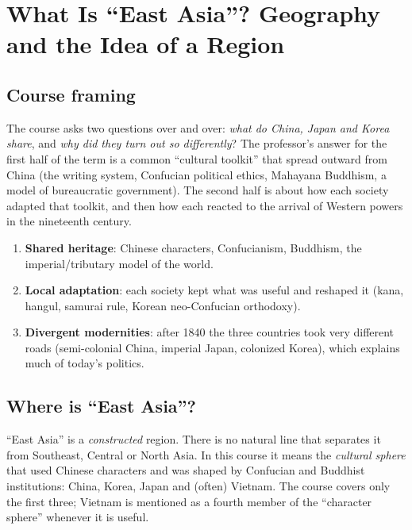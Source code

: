 \chapter{What Is ``East Asia''? Geography and the Idea of a Region}

\section{Course framing}

The course asks two questions over and over: \emph{what do China, Japan and Korea share},
and \emph{why did they turn out so differently}? The professor's answer for the first half
of the term is a common ``cultural toolkit'' that spread outward from China (the writing
system, Confucian political ethics, Mahayana Buddhism, a model of bureaucratic
government). The second half is about how each society adapted that toolkit, and then how
each reacted to the arrival of Western powers in the nineteenth century.

\begin{important}
\begin{enumerate}
  \item \textbf{Shared heritage}: Chinese characters, Confucianism, Buddhism, the
        imperial/tributary model of the world.
  \item \textbf{Local adaptation}: each society kept what was useful and reshaped it
        (kana, hangul, samurai rule, Korean neo-Confucian orthodoxy).
  \item \textbf{Divergent modernities}: after 1840 the three countries took very different
        roads (semi-colonial China, imperial Japan, colonized Korea), which explains much
        of today's politics.
\end{enumerate}
\end{important}

\section{Where is ``East Asia''?}

``East Asia'' is a \emph{constructed} region. There is no natural line that separates it
from Southeast, Central or North Asia. In this course it means the \emph{cultural sphere}
that used Chinese characters and was shaped by Confucian and Buddhist institutions:
China, Korea, Japan and (often) Vietnam. The course covers only the first three; Vietnam
is mentioned as a fourth member of the ``character sphere'' whenever it is useful.

